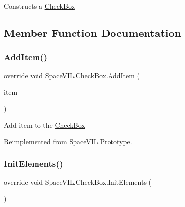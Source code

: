 Constructs a \mbox{\hyperlink{class_space_v_i_l_1_1_check_box}{Check\+Box}} 



\subsection{Member Function Documentation}
\mbox{\label{class_space_v_i_l_1_1_check_box_a4effb830a35810780edb874d9ba05cfe}} 
\subsubsection{\texorpdfstring{Add\+Item()}{AddItem()}}
{\footnotesize\ttfamily override void Space\+V\+I\+L.\+Check\+Box.\+Add\+Item (\begin{DoxyParamCaption}\item[{\mbox{\hyperlink{interface_space_v_i_l_1_1_core_1_1_i_base_item}{I\+Base\+Item}}}]{item }\end{DoxyParamCaption})\hspace{0.3cm}{\ttfamily [virtual]}}



Add item to the \mbox{\hyperlink{class_space_v_i_l_1_1_check_box}{Check\+Box}} 



Reimplemented from \mbox{\hyperlink{class_space_v_i_l_1_1_prototype}{Space\+V\+I\+L.\+Prototype}}.

\mbox{\label{class_space_v_i_l_1_1_check_box_a5e4b6ce5dd4e68da0cf678025a7fb0fb}} 
\subsubsection{\texorpdfstring{Init\+Elements()}{InitElements()}}
{\footnotesize\ttfamily override void Space\+V\+I\+L.\+Check\+Box.\+Init\+Elements (\begin{DoxyParamCaption}{ }\end{DoxyParamCaption})\hspace{0.3cm}{\ttfamily [virtual]}}



